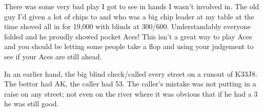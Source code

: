 There was some very bad play I got to see in hands I wasn't involved in.
The old guy I'd given a lot of chips to and who was a big chip leader
at my table at the time shoved all in for 19,000 with blinds at 300/600.
Understandably everyone folded and he proudly showed pocket Aces! This
isn't a great way to play Aces and you should be letting some people
take a flop and using your judgement to see if your Aces are still ahead.

In an earlier hand, the big blind check/called every street on a runout
of K33J8. The bettor had AK, the caller had 53. The caller's mistake was
not putting in a raise on any street; not even on the river where it
was obvious that if he had a 3 he was still good.
